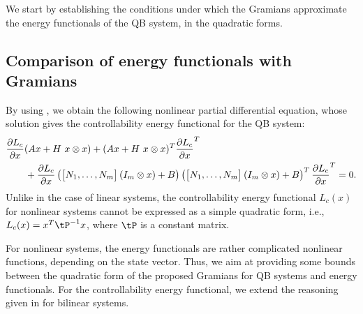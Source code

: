 We start by establishing the conditions under which  the Gramians approximate the energy functionals of the QB system, in the quadratic forms.
\subsection{Comparison of energy functionals with  Gramians}\label{subsec:energy}
By using , we obtain the following nonlinear partial differential equation, whose solution gives the controllability energy functional for the QB system:
\begin{equation}\label{eq:control_energy_QB}
\begin{aligned}
 &\dfrac{\partial L_c}{\partial x}(Ax + H~x\otimes x) +  (Ax + H~x\otimes x)^T\dfrac{\partial L_c}{\partial x}^T  \\
 &\qquad + \dfrac{\partial L_c}{\partial x}\left(\begin{bmatrix} N_1,\ldots, N_m \end{bmatrix} (I_m\otimes x) + B\right)\left(\begin{bmatrix} N_1,\ldots, N_m \end{bmatrix} (I_m\otimes x) + B\right)^T \dfrac{\partial L_c}{\partial x} ^T = 0.
\end{aligned}
\end{equation}
 Unlike in the case of linear systems, the controllability energy functional $L_c(x)$ for nonlinear systems cannot be expressed as a simple quadratic form, i.e., $L_c(x) = x^T\tP^{-1}x$, where $\tP$ is a constant matrix. 
 
 For nonlinear systems, the energy functionals are rather complicated nonlinear functions, depending on the state vector. Thus, we aim at providing some bounds between the quadratic form of the proposed Gramians for QB systems and energy functionals. For the controllability energy functional, we  extend the reasoning given in \cite{morBenD11,bennertruncated} for bilinear systems.
 
